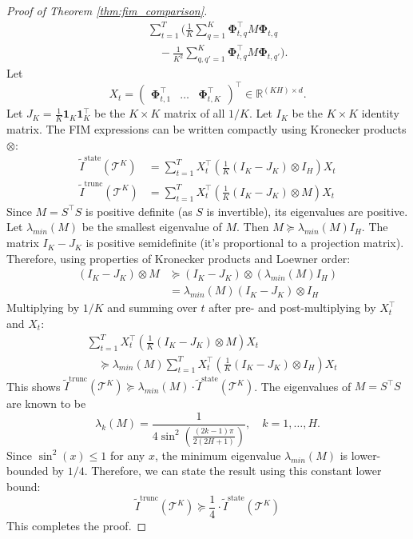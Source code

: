 \documentclass[10pt,a4paper]{amsart}
\newcommand{\bPhi}{\mathbf{\Phi}}
\begin{document}
\begin{proof}[Proof of Theorem \ref{thm:fim_comparison}]
\begin{align*}
&\quad \sum_{t=1}^T \Bigg(
\frac{1}{K} \sum_{q=1}^K \bPhi_{t,q}^\top M \bPhi_{t,q} \\
&\qquad - \frac{1}{K^2} \sum_{q,q'=1}^K \bPhi_{t,q}^\top M \bPhi_{t,q'} \Bigg).
\end{align*}
Let
\[
X_t = \begin{pmatrix} \bPhi_{t,1}^\top & \dots & \bPhi_{t,K}^\top \end{pmatrix}^\top \in \mathbb{R}^{(KH) \times d}.
\]
Let $J_K = \frac{1}{K} \mathbf{1}_K \mathbf{1}_K^\top$ be the $K \times K$ matrix of all $1/K$.
Let $I_K$ be the $K \times K$ identity matrix.
The FIM expressions can be written compactly using Kronecker products $\otimes$:
\begin{align*}
\tilde{I}^{\text{state}}(\mathcal{T}^K) &= \sum_{t=1}^T X_t^\top \left( \frac{1}{K} (I_K - J_K) \otimes I_H \right) X_t \\
\tilde{I}^{\text{trunc}}(\mathcal{T}^K) &= \sum_{t=1}^T X_t^\top \left( \frac{1}{K} (I_K - J_K) \otimes M \right) X_t
\end{align*}
Since $M = S^\top S$ is positive definite (as $S$ is invertible), its eigenvalues are positive. Let $\lambda_{min}(M)$ be the smallest eigenvalue of $M$. Then $M \succeq \lambda_{min}(M) I_H$.
The matrix $I_K - J_K$ is positive semidefinite (it's proportional to a projection matrix).
Therefore, using properties of Kronecker products and Loewner order:
\begin{align*}
(I_K - J_K) \otimes M
&\succeq (I_K - J_K) \otimes (\lambda_{min}(M) I_H) \\
&= \lambda_{min}(M) (I_K - J_K) \otimes I_H
\end{align*}
Multiplying by $1/K$ and summing over $t$ after pre- and post-multiplying by $X_t^\top$ and $X_t$:
\begin{align*}
&\sum_{t=1}^T X_t^\top \left( \frac{1}{K} (I_K - J_K) \otimes M \right) X_t \\
&\quad \succeq \lambda_{min}(M) \sum_{t=1}^T X_t^\top \left( \frac{1}{K} (I_K - J_K) \otimes I_H \right) X_t
\end{align*}
This shows $\tilde{I}^{\text{trunc}}(\mathcal{T}^K) \succeq \lambda_{min}(M) \cdot \tilde{I}^{\text{state}}(\mathcal{T}^K)$.
The eigenvalues of $M=S^\top S$ are known to be
\[
\lambda_k(M) = \frac{1}{4 \sin^2\left(\frac{(2k-1)\pi}{2(2H+1)}\right)}, \quad k=1, \dots, H.
\]
Since $\sin^2(x) \le 1$ for any $x$, the minimum eigenvalue $\lambda_{min}(M)$ is lower-bounded by $1/4$.
Therefore, we can state the result using this constant lower bound:
\[ \tilde{I}^{\text{trunc}}(\mathcal{T}^K) \succeq \frac{1}{4} \cdot \tilde{I}^{\text{state}}(\mathcal{T}^K) \]
This completes the proof.
\end{proof}
\end{document}
